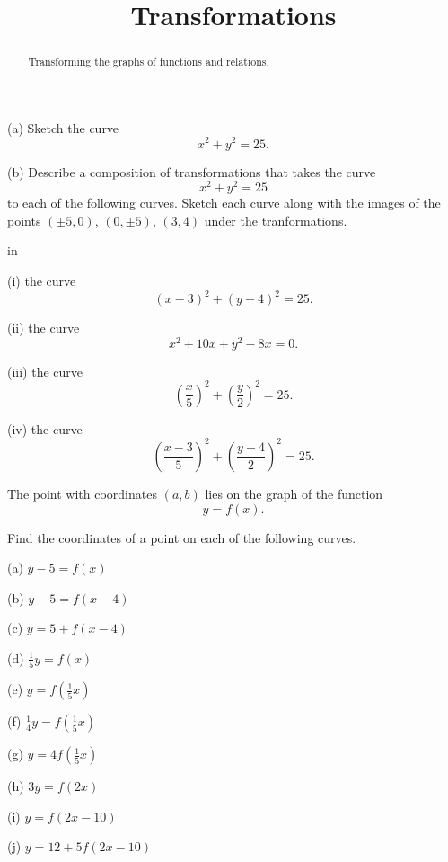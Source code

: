 \documentclass{ximera}
\title{Transformations}
\newcommand{\pskip}{\vskip 0.1 in}
\begin{document}
\begin{abstract}
Transforming the graphs of functions and relations.
\end{abstract}
\maketitle



\begin{question}  \label{Q:324bt44t}
(a) Sketch the curve
\[
    x^2 + y^2 = 25 .
\]

(b) Describe a composition of transformations that takes the curve
\[
        x^2 + y^2 = 25
\]
to each of the following curves. Sketch each curve along with the images of the points $(\pm 5,0)$, $(0,\pm 5)$, $(3,4)$ under the tranformations.

\pskip

(i) the curve
\[
          (x-3)^2 + (y+4)^2 = 25 .
\]

(ii)  the curve
\[
          x^2 +10x +y^2 - 8x = 0 .
\]

(iii) the curve
\[
       \left( \frac{x}{5} \right)^2 + \left( \frac{y}{2} \right)^2 = 25 .
\]

(iv) the curve
\[
       \left( \frac{x-3}{5} \right)^2 + \left( \frac{y-4}{2} \right)^2 = 25 .
\]

\end{question}


\begin{question}  \label{Q:3dd5r555234}
The point with coordinates $(a,b)$ lies on the graph of the function
\[
  y = f(x).
\]

Find the coordinates of a point on each of the following curves.

(a) $y - 5 = f(x)$

(b) $y - 5 = f(x-4)$

(c) $y= 5 + f(x-4)$

(d) $\frac{1}{5}y = f(x)$

(e) $y = f\left( \frac{1}{5} x \right)$

(f) $\frac{1}{4}y =  f\left( \frac{1}{5} x \right)$

(g) $y =  4  f\left( \frac{1}{5} x \right)$

(h) $3y = f(2x)$

(i) $y = f(2x-10)$

(j) $y = 12 + 5 f(2x-10)$

\end{question}
\end{document}
